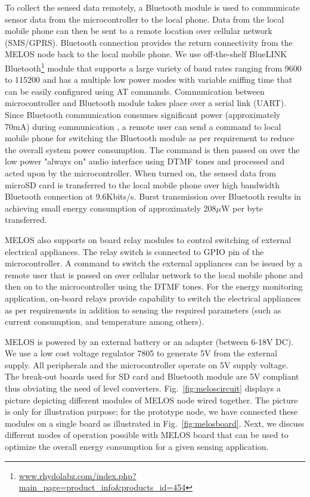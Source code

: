 \documentclass[10pt]{sigplan-proc-varsize}
\newcommand{\figref}[1]{Fig.~\ref{#1}}
\newcommand{\melos}{MELOS }
\begin{document}
To collect the sensed data remotely, a Bluetooth module is used to communicate sensor data from the microcontroller to the local phone. Data from the local mobile phone can then be sent to a remote location over cellular network (SMS/GPRS). Bluetooth connection provides the return connectivity from the \melos node back to the local mobile phone. We use off-the-shelf BlueLINK Bluetooth\footnote{\url{www.rhydolabz.com/index.php?main_page=product_info&products_id=454}} module that supports a large variety of baud rates ranging from 9600 to 115200 and has a multiple low power modes with variable sniffing time that can be easily configured using AT commands. Communication between microcontroller and Bluetooth module takes place over a serial link (UART). Since Bluetooth communication consumes significant power (approximately 70mA) during communication , a remote user can send a command to local mobile phone for switching the Bluetooth module as per requirement to reduce the overall system power consumption. The command is then passed on over the low power "always on" audio interface using DTMF tones and processed and acted upon by the microcontroller. When turned on, the sensed data from microSD card is transferred to the local mobile phone over high bandwidth Bluetooth connection at 9.6Kbits/s. Burst transmission over Bluetooth results in achieving small energy consumption of approximately 208$\mu$W per byte transferred.

\melos also supports on board relay modules to control switching of external electrical appliances. The relay switch is connected to GPIO pin of the microcontroller. A command to switch the external appliances can be issued by a remote user that is passed on over cellular network to the local mobile phone and then on to the microcontroller using the DTMF tones. For the energy monitoring application, on-board relays provide capability to switch the electrical appliances as per requirements in addition to sensing the required parameters (such as current consumption, and temperature among others).  

\melos is powered by an external battery or an adapter (between 6-18V DC). We use a low cost voltage regulator 7805 to generate 5V from the external supply. All peripherals and the microcontroller operate on 5V supply voltage. The break-out boards used for SD card and Bluetooth module are 5V compliant thus obviating the need of level converters. \figref{fig:meloscircuit} displays a picture depicting different modules of \melos node wired together. The picture is only for illustration purpose; for the prototype node, we have connected these modules on a single board as illustrated in \figref{fig:melosboard}. Next,  we discuss different modes of operation possible with \melos board that can be used to optimize the overall energy consumption for a given sensing application.
\end{document}
